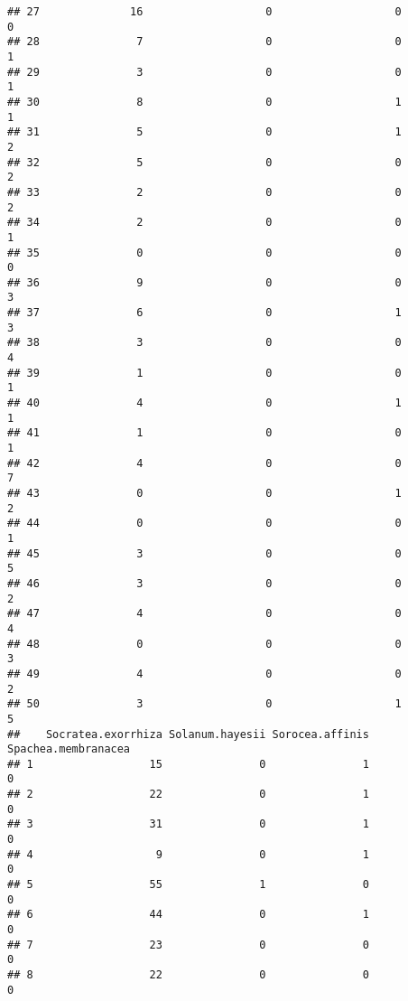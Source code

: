 \documentclass[
]{article}
\begin{document}
\begin{verbatim}
## 27              16                   0                   0                  0
## 28               7                   0                   0                  1
## 29               3                   0                   0                  1
## 30               8                   0                   1                  1
## 31               5                   0                   1                  2
## 32               5                   0                   0                  2
## 33               2                   0                   0                  2
## 34               2                   0                   0                  1
## 35               0                   0                   0                  0
## 36               9                   0                   0                  3
## 37               6                   0                   1                  3
## 38               3                   0                   0                  4
## 39               1                   0                   0                  1
## 40               4                   0                   1                  1
## 41               1                   0                   0                  1
## 42               4                   0                   0                  7
## 43               0                   0                   1                  2
## 44               0                   0                   0                  1
## 45               3                   0                   0                  5
## 46               3                   0                   0                  2
## 47               4                   0                   0                  4
## 48               0                   0                   0                  3
## 49               4                   0                   0                  2
## 50               3                   0                   1                  5
##    Socratea.exorrhiza Solanum.hayesii Sorocea.affinis Spachea.membranacea
## 1                  15               0               1                   0
## 2                  22               0               1                   0
## 3                  31               0               1                   0
## 4                   9               0               1                   0
## 5                  55               1               0                   0
## 6                  44               0               1                   0
## 7                  23               0               0                   0
## 8                  22               0               0                   0

\end{verbatim}
\end{document}
